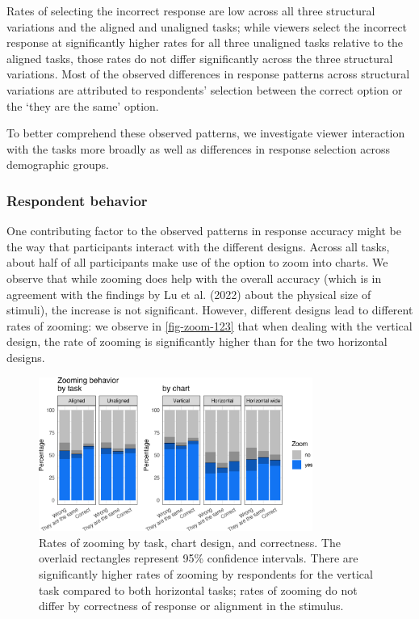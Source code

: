 \documentclass[
]{jds}
\begin{document}
Rates of selecting the incorrect response are low across all three
structural variations and the aligned and unaligned tasks; while viewers
select the incorrect response at significantly higher rates for all
three unaligned tasks relative to the aligned tasks, those rates do not
differ significantly across the three structural variations. Most of the
observed differences in response patterns across structural variations
are attributed to respondents' selection between the correct option or
the `they are the same' option.

To better comprehend these observed patterns, we investigate viewer
interaction with the tasks more broadly as well as differences in
response selection across demographic groups.

\hypertarget{respondent-behavior}{%
\subsubsection{Respondent behavior}\label{respondent-behavior}}

One contributing factor to the observed patterns in response accuracy
might be the way that participants interact with the different designs.
Across all tasks, about half of all participants make use of the option
to zoom into charts. We observe that while zooming does help with the
overall accuracy (which is in agreement with the findings by Lu et al.
(2022) about the physical size of stimuli), the increase is not
significant. However, different designs lead to different rates of
zooming: we observe in \autoref{fig-zoom-123} that when dealing with the
vertical design, the rate of zooming is significantly higher than for
the two horizontal designs.

\begin{figure}[hbt]

{\centering \includegraphics[width=0.8\textwidth,height=\textheight]{./figures/fig-zoom-123-1.png}

}

\caption{\label{fig-zoom-123}Rates of zooming by task, chart design, and
correctness. The overlaid rectangles represent 95\% confidence
intervals. There are significantly higher rates of zooming by
respondents for the vertical task compared to both horizontal tasks;
rates of zooming do not differ by correctness of response or alignment
in the stimulus.}

\end{figure}
\end{document}
